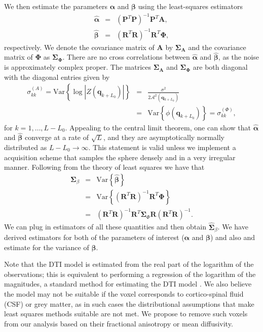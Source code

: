 \documentclass[authoryear,preprint,12pt]{elsarticle}
\newcommand{\var}{\text{Var}}
\newcommand{\q}{\mathbf{q}}
\newcommand{\bsS}{\bs{\Sigma}}
\newcommand{\cA}{\mathcal{A}}
\newcommand{\bld}[1]{\mathbf{#1}}
\newcommand{\bs}[1]{\boldsymbol{#1}}
\newcommand{\wh}[1]{\widehat{#1}}
\begin{document}
We then estimate the parameters $\bs{\alpha}$ and $\bs{\beta}$
using the least-squares estimators
\begin{eqnarray}
  \hat{\bs{\alpha}} &=& \left(\bld{P}^T\bld{P}\right)^{-1}
  \bld{P}^T\bld{A},\\
  \hat{\bs{\beta}} &=& \left(\bld{R}^T\bld{R}\right)^{-1}\bld{R}^T
  \bs{\Phi},
\end{eqnarray}
respectively.  We denote the covariance matrix of $\bld{A}$ by
$\bsS_\bld{A}$ and the covariance matrix of $\bs{\Phi}$ as
$\bsS_{\bs{\Phi}}$.  There are no cross correlations between
$\hat{\bs{\alpha}}$ and $\hat{\bs{\beta}}$, as the noise is
approximately complex proper.  The matrices $\bsS_\bld{A}$ and
$\bsS_{\bs{\Phi}}$ are both diagonal with the diagonal entries given
by
\begin{eqnarray*}
  \sigma_{kk}^{(A)} = \var\left\{\log\left|Z(\q_{k+L_0})\right|\right\} &=&
  \frac{\sigma^2}{2\cA^2(\q_{k+L_0})}\\
  &=& \var\left\{\phi(\q_{k+L_0})\right\} = \sigma_{kk}^{(\Phi)},
\end{eqnarray*}
for $k=1,\dots,L-L_0$.  Appealing to the central limit theorem, one
can show that $\hat{\bs{\alpha}}$ and $\hat{\bs{\beta}}$ converge at a
rate of $\sqrt{L}$, and they are asymptotically normally distributed
as $L-L_0\rightarrow\infty$.  This statement is valid unless we
implement a acquisition scheme that samples the sphere densely and in
a very irregular manner.  Following from the theory of least squares
we have that
\begin{eqnarray}
  \nonumber
  \bsS_{\beta} &=& \var\left\{\hat{\bs{\beta}}\right\}\\
  &=& \nonumber
  \var\left\{\left(\bld{R}^T\bld{R}\right)^{-1}\bld{R}^T\bs{\Phi}\right\}\\  
  &=& \left(\bld{R}^T\bld{R}\right)^{-1}\bld{R}^T
  \bsS_\Phi\bld{R} \left(\bld{R}^T\bld{R}\right)^{-1}.
\end{eqnarray}
We can plug in estimators of all these quantities and then obtain
$\wh{\bsS}_{\beta}$.  We have derived estimators for both of
the parameters of interest ($\bs{\alpha}$ and $\bs{\beta}$) and also
and estimate for the variance of $\bs{\beta}$.

Note that the DTI model is estimated from the real part of the
logarithm of the observations; this is equivalent to performing a
regression of the logarithm of the magnitudes, a standard method for
estimating the DTI model \citep{Basser1994}.  We also believe the
model may not be suitable if the voxel corresponds to cortico-spinal
fluid (CSF) or grey matter, as in such cases the distributional
assumptions that make least squares methods suitable are not met. We
propose to remove such voxels from our analysis based on their
fractional anisotropy or mean diffusivity.
\end{document}
